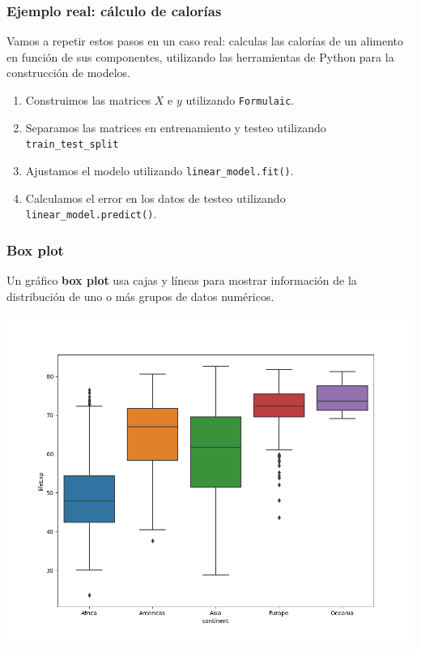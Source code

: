 \documentclass[aspectratio=169,12pt]{beamer}
\begin{document}
\begin{frame}
\frametitle{Ejemplo real: cálculo de calorías}

Vamos a repetir estos pasos en un caso real: calculas las calorías de un alimento en función de sus componentes, utilizando las herramientas de Python para la construcción de modelos.
\begin{enumerate}
\item Construimos las matrices $X$ e $y$ utilizando \lstinline{Formulaic}.
\item Separamos las matrices en entrenamiento y testeo utilizando \lstinline{train_test_split}
\item Ajustamos el modelo utilizando \lstinline{linear_model.fit()}.
\item Calculamos el error en los datos de testeo utilizando \lstinline{linear_model.predict()}.
\end{enumerate}

\end{frame}



\begin{frame}
\frametitle{Box plot}

Un gráfico \textbf{box plot} usa cajas y líneas para mostrar información de la distribución de uno o más grupos de datos numéricos.

\begin{center}
\includegraphics[scale=.3]{practica3-img-gapminder-boxplot.png}
\end{center}

\end{frame}
\end{document}
